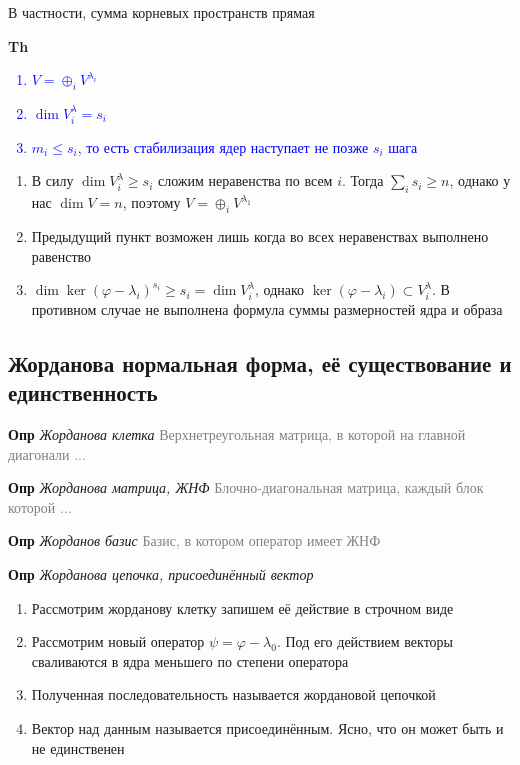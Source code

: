 В частности, сумма корневых пространств прямая

\textbf{Th} \textcolor{blue}{
    \begin{enumerate}
        \item $V = \oplus_i V^{\lambda_i}$
        \item $\dim V^\lambda_i = s_i$
        \item $m_i \leq s_i$, то есть стабилизация ядер наступает не позже $s_i$ шага
    \end{enumerate}             }

\begin{enumerate}
    \item В силу $\dim V^\lambda_i \geq s_i$ сложим неравенства по всем $i$.
    Тогда $\sum_i s_i \geq n$, однако у нас $\dim V = n$, поэтому $V = \oplus_i V^{\lambda_1}$
    \item Предыдущий пункт возможен лишь когда во всех неравенствах выполнено равенство
    \item $\dim \ker (\varphi - \lambda_i)^{s_i} \geq s_i = \dim V^\lambda_i$, однако $\ker (\varphi -
    \lambda_i) \subset V^\lambda_i$.
    В противном случае не выполнена формула суммы размерностей ядра и образа
\end{enumerate}

\subsection{Жорданова нормальная форма, её существование и единственность}

\textbf{Опр} \textit{Жорданова клетка} \textcolor{gray}{Верхнетреугольная матрица, в которой на главной диагонали ...}

\textbf{Опр} \textit{Жорданова матрица, ЖНФ} \textcolor{gray}{Блочно-диагональная матрица, каждый блок которой ...}

\textbf{Опр} \textit{Жорданов базис} \textcolor{gray}{Базис, в котором оператор имеет ЖНФ}

\textbf{Опр} \textit{Жорданова цепочка, присоединённый вектор}

\begin{enumerate}
    \item Рассмотрим жорданову клетку запишем её действие в строчном виде
    \item Рассмотрим новый оператор $\psi = \varphi - \lambda_0$.
    Под его действием векторы сваливаются в ядра меньшего по степени оператора
    \item Полученная последовательность называется жордановой цепочкой
    \item Вектор над данным называется присоединённым.
    Ясно, что он может быть и не единственен
\end{enumerate}


